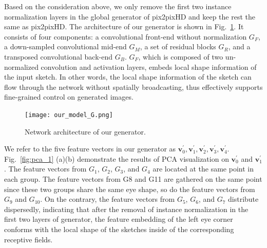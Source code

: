 Based on the consideration above, we only remove the first two instance normalization layers in the global generator of pix2pixHD and keep the rest the same as pix2pixHD. 
The architecture of our generator is shown in Fig.~\ref{fig:our_generator}. 
It consists of four components: a convolutional front-end without normalization $G_F$, a down-sampled convolutional mid-end $G_M$, a set of residual blocks $G_R$, and a transposed convolutional back-end $G_B$.  
$G_F$, which is composed of two un-normalized convolution and activation layers, embeds local shape information of the input sketch.
In other words, the local shape information of the sketch can flow through the network without spatially broadcasting, thus effectively supports fine-grained control on generated images. 

\begin{figure}[htbp]
	\centering
	\texttt{[image: our\_model\_G.png]}
	\caption{Network architecture of our generator. }
	\label{fig:our_generator}
\end{figure}


We refer to the five feature vectors in our generator as $\boldsymbol{v}_0^{'},\boldsymbol{v}_1^{'},\boldsymbol{v}_2^{'},\boldsymbol{v}_3^{'},\boldsymbol{v}_4^{'}$.
%
Fig.~\ref{fig:pca_1} (a)(b) demonstrate the results of PCA visualization on $\boldsymbol{v}_0^{'}$ and $\boldsymbol{v}_1^{'}$. 
The feature vectors from $G_1$, $G_2$, $G_3$, and $G_4$ are located at the same point in each group. The feature vectors from G8 and G11 are gathered on the same point since these two groups share the same eye shape, so do the feature vectors from $G_9$ and $G_{10}$.
On the contrary, the feature vectors from $G_5$, $G_6$, and $G_7$ distribute dispersedly, indicating that after the removal of instance normalization in the first two layers of generator, the feature embedding of the left eye corner conforms with the local shape of the sketches inside of the corresponding receptive fields. 


